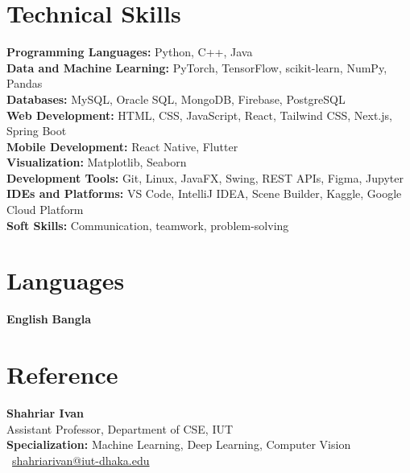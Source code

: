 \documentclass{resume}
\renewenvironment{rSection}[1]{
  \section{#1}
  \begin{list}{}{
      \setlength{\leftmargin}{0.2em}
  }
  \item[]
}{
  \end{list}
  \vspace{0pt}
}
\begin{document}
\begin{rSection}{Technical Skills}
\textbf{Programming Languages:} Python, C++, Java \\
\textbf{Data and Machine Learning:} PyTorch, TensorFlow, scikit-learn, NumPy, Pandas \\
\textbf{Databases:} MySQL, Oracle SQL, MongoDB, Firebase, PostgreSQL \\
\textbf{Web Development:} HTML, CSS, JavaScript, React, Tailwind CSS, Next.js, Spring Boot \\
\textbf{Mobile Development:} React Native, Flutter \\
\textbf{Visualization:} Matplotlib, Seaborn \\
\textbf{Development Tools:} Git, Linux, JavaFX, Swing, REST APIs, Figma, Jupyter \\
\textbf{IDEs and Platforms:} VS Code, IntelliJ IDEA, Scene Builder, Kaggle, Google Cloud Platform \\
\textbf{Soft Skills:} Communication, teamwork, problem-solving
\end{rSection}

\begin{rSection}{Languages}
\textbf{English} \quad \textbf{Bangla}
\end{rSection}

\begin{rSection}{Reference}
\textbf{Shahriar Ivan} \\
Assistant Professor, Department of CSE, IUT \\
\textbf{Specialization:} Machine Learning, Deep Learning, Computer Vision \\
\faEnvelope\ \href{mailto:shahriarivan@iut-dhaka.edu}{shahriarivan@iut-dhaka.edu}
\end{rSection}
\end{document}
